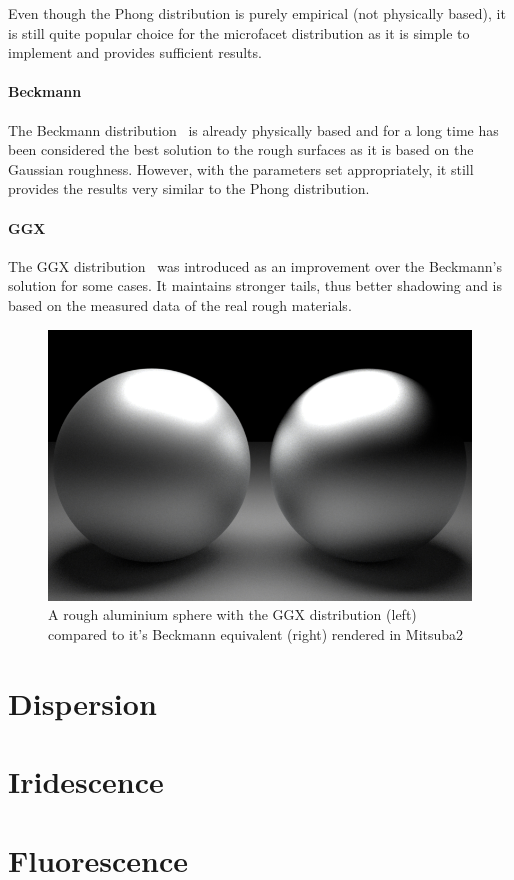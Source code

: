 Even though the Phong distribution is purely empirical (not physically based), it is still quite popular choice for the microfacet distribution as it is simple to implement and provides sufficient results.

\paragraph{Beckmann}

The Beckmann distribution~\cite{beckmann1987scattering} is already physically based and for a long time has been considered the best solution to the rough surfaces as it is based on the Gaussian roughness. However, with the parameters set appropriately, it still provides the results very similar to the Phong distribution.

\paragraph{GGX}

The GGX distribution~\cite{walter2007microfacet} was introduced as an improvement over the Beckmann's solution for some cases. It maintains stronger tails, thus better shadowing and is based on the measured data of the real rough materials.

\begin{figure}[httpb]
	\centering
	\includegraphics[width=.8\linewidth]{img/ggx_beckmann.png}
	\caption{A rough aluminium sphere with the GGX distribution (left) compared to it's Beckmann equivalent (right) rendered  in Mitsuba2}
	\label{fig:ggx_beckmann}
\end{figure}

\section{Dispersion}

\section{Iridescence}


\section{Fluorescence}